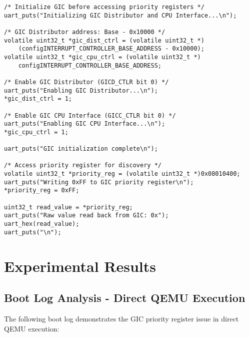 \documentclass[12pt,a4paper]{article}
\begin{document}
\begin{lstlisting}[caption={GIC Priority Register Debugging Implementation}]
/* Initialize GIC before accessing priority registers */
uart_puts("Initializing GIC Distributor and CPU Interface...\n");

/* GIC Distributor address: Base - 0x10000 */
volatile uint32_t *gic_dist_ctrl = (volatile uint32_t *)
    (configINTERRUPT_CONTROLLER_BASE_ADDRESS - 0x10000);
volatile uint32_t *gic_cpu_ctrl = (volatile uint32_t *)
    configINTERRUPT_CONTROLLER_BASE_ADDRESS;

/* Enable GIC Distributor (GICD_CTLR bit 0) */
uart_puts("Enabling GIC Distributor...\n");
*gic_dist_ctrl = 1;

/* Enable GIC CPU Interface (GICC_CTLR bit 0) */
uart_puts("Enabling GIC CPU Interface...\n"); 
*gic_cpu_ctrl = 1;

uart_puts("GIC initialization complete\n");

/* Access priority register for discovery */
volatile uint32_t *priority_reg = (volatile uint32_t *)0x08010400;
uart_puts("Writing 0xFF to GIC priority register\n");
*priority_reg = 0xFF;

uint32_t read_value = *priority_reg;
uart_puts("Raw value read back from GIC: 0x");
uart_hex(read_value);
uart_puts("\n");
\end{lstlisting}

\section{Experimental Results}

\subsection{Boot Log Analysis - Direct QEMU Execution}

The following boot log demonstrates the GIC priority register issue in direct QEMU execution:
\end{document}
